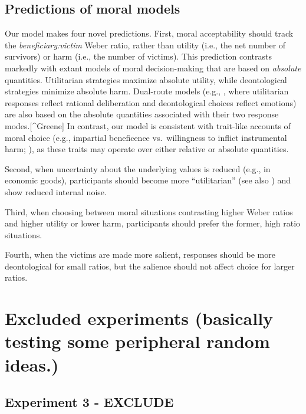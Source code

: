 \documentclass[
]{article}
\begin{document}
\subsection{Predictions of moral models}\label{predictions-of-moral-models}

Our model makes four novel predictions. First, moral acceptability should track the \emph{beneficiary:victim} Weber ratio, rather than utility (i.e., the net number of survivors) or harm (i.e., the number of victims). This prediction contrasts markedly with extant models of moral decision-making that are based on \emph{absolute} quantities. Utilitarian strategies maximize absolute utility, while deontological strategies minimize absolute harm. Dual-route models (e.g., \autocite{Greene2001-moral}, where utilitarian responses reflect rational deliberation and deontological choices reflect emotions) are also based on the absolute quantities associated with their two response modes.{[}\^{}Greene{]} In contrast, our model is consistent with trait-like accounts of moral choice (e.g., impartial beneficence vs.~willingness to inflict instrumental harm; \autocite{Kahane2018}), as these traits may operate over either relative or absolute quantities.

Second, when uncertainty about the underlying values is reduced (e.g., in economic goods), participants should become more ``utilitarian'' (see also \autocite{Caviola2021}) and show reduced internal noise.

Third, when choosing between moral situations contrasting higher Weber ratios and higher utility or lower harm, participants should prefer the former, high ratio situations.

Fourth, when the victims are made more salient, responses should be more deontological for small ratios, but the salience should not affect choice for larger ratios.

\clearpage

\section{Excluded experiments (basically testing some peripheral random ideas.)}\label{excluded-experiments-basically-testing-some-peripheral-random-ideas.}

\subsection{Experiment 3 - EXCLUDE}\label{experiment-3---exclude}
\end{document}
